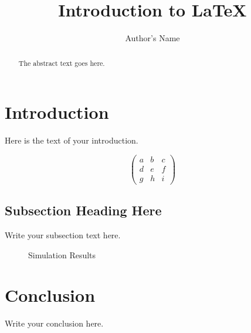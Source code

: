 \documentclass{article}
\begin{document}
\title{Introduction to \LaTeX{}}
\author{Author's Name}

\maketitle

\begin{abstract}
The abstract text goes here.
\end{abstract}

\section{Introduction}
Here is the text of your introduction.

\[ \left( \begin{array}{ccc}
a & b & c \\
d & e & f \\
g & h & i \end{array} \right)\]

\subsection{Subsection Heading Here}
Write your subsection text here.

\begin{figure}
    \centering
    \caption{Simulation Results}
    \label{simulationfigure}
\end{figure}

\section{Conclusion}
Write your conclusion here.
\end{document}
